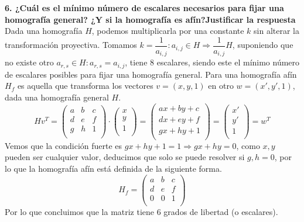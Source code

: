 \documentclass[12pt,a4paper]{article}
\begin{document}
	\newpage
	\textbf{6. ¿Cuál es el mínimo número de escalares necesarios para fijar 
	una homografía general? ¿Y si la homografía es afín?Justificar la respuesta}
	\newline\newline
	Dada una homografía $H$, podemos multiplicarla por una constante $k$ sin alterar la transformación proyectiva. Tomamos $k=\dfrac{1}{a_{i,j}} : a_{i,j}\in H \Rightarrow \dfrac{1}{a_{i,j}} H$, suponiendo que no existe otro $a_{r,s}\in H : a_{r,s} = a_{i,j} $, tiene 8 escalares, siendo este el mínimo número de escalares posibles para fijar una homografía general.
	\newline
	\newline
	Para una homografía afín $H_f$ es aquella que transforma los vectores $v=(x, y, 1)$ en otro $w=(x', y', 1)$, dada una homografía general $H$.
	$$
		Hv^T =
		\begin{pmatrix}
		a & b & c\\
		d & e & f\\
		g & h & 1\\
		\end{pmatrix}\cdot \begin{pmatrix}
		x\\
		y\\
		1\\
		\end{pmatrix}=\begin{pmatrix}
		ax+by+c\\
		dx+ey+f\\
		gx+hy+1\\
		\end{pmatrix}=\begin{pmatrix}
		x'\\
		y'\\
		1\\
		\end{pmatrix}=w^T
	$$
	Vemos que la condición fuerte es $gx+hy+1=1\Rightarrow gx+hy=0$, como $x, y$ pueden ser cualquier valor, deducimos que solo se puede resolver si $g,h=0$, por lo que la homografía afín está definida de la siguiente forma. 
	$$
	H_f =
	\begin{pmatrix}
	a & b & c\\
	d & e & f\\
	0 & 0 & 1\\
	\end{pmatrix}
	$$
	Por lo que concluimos que la matriz tiene 6 grados de libertad (o escalares).
	
\end{document}
